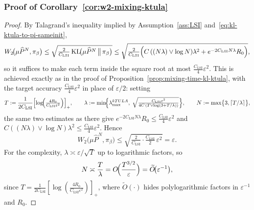 \documentclass[11pt,a4paper,reqno]{amsart}
\theoremstyle{plain}
\theoremstyle{definition}
\theoremstyle{remark}
\newcommand{\KL}{\mathrm{KL}}
\begin{document}
\subsubsection{Proof of Corollary~\ref{cor:w2-mixing-ktula}}
\label{proof:w2-ktula}
\begin{proof}
By Talagrand's inequality implied by Assumption~\ref{ass:LSI} and~\eqref{eq:kl-ktula-to-pi-sameinit},
\[
  W_2\!\bigl(\mu\widehat P^{N},\pi_\beta\bigr)
  \le
  \sqrt{\tfrac{2}{C_{\mathrm{LSI}}}\,\KL\!\bigl(\mu\widehat P^{N}\,\big\|\,\pi_\beta\bigr)}
  \le
  \sqrt{\tfrac{2}{C_{\mathrm{LSI}}}
  \Bigl(C\,((N\lambda)\vee \log N)\lambda^2 + e^{-2C_{\mathrm{LSI}}N\lambda}R_0\Bigr)},
\]
so it suffices to make each term inside the square root at most $\tfrac{C_{\mathrm{LSI}}}{4}\varepsilon^2$. This is achieved exactly as in the proof of Proposition~\ref{prop:mixing-time-kl-ktula}, with the target accuracy $\tfrac{C_{\mathrm{LSI}}}{4}\varepsilon^2$ in place of $\varepsilon/2$: setting
\[
  T:=\frac{1}{2C_{\mathrm{LSI}}}
  \Bigl[\log\!\Bigl(\tfrac{4R_0}{C_{\mathrm{LSI}}\varepsilon^2}\Bigr)\Bigr]_+,
  \qquad
  \lambda:=\min\!\Bigl\{\lambda_{\max}^{kTULA},\;
  \sqrt{\tfrac{C_{\mathrm{LSI}}\varepsilon^2}{4C\,(T\vee \log(3+T/\lambda))}}\Bigr\},
  \qquad
  N:=\max\bigl\{3,\lceil T/\lambda\rceil\bigr\},
\]
the same two estimates as there give $e^{-2C_{\mathrm{LSI}}N\lambda}R_0\le\tfrac{C_{\mathrm{LSI}}}{4}\varepsilon^2$ and $C((N\lambda)\vee\log N)\lambda^2\le\tfrac{C_{\mathrm{LSI}}}{4}\varepsilon^2$. Hence
\[
  W_2\!\bigl(\mu\widehat P^{N},\pi_\beta\bigr)
  \le
  \sqrt{\tfrac{2}{C_{\mathrm{LSI}}}\cdot\tfrac{C_{\mathrm{LSI}}}{2}\,\varepsilon^2}
  =\varepsilon.
\]
For the complexity, $\lambda\asymp\varepsilon/\sqrt{T}$ up to logarithmic factors, so
\[
  N\asymp \frac{T}{\lambda}
  =
  O\!\Bigl(\frac{T^{3/2}}{\varepsilon}\Bigr)
  =
  \widetilde O\!\bigl(\varepsilon^{-1}\bigr),
\]
since $T=\tfrac{1}{2C_{\mathrm{LSI}}}[\log\left(\frac{4R_0}{C_{\mathrm{LSI}}\varepsilon^2}\right)]_+$, where $\widetilde O(\cdot)$ hides polylogarithmic factors in $\varepsilon^{-1}$ and $R_0$.
\end{proof}
\end{document}
